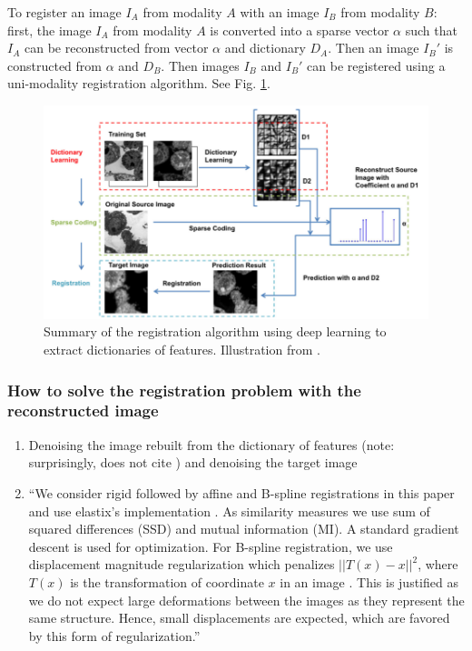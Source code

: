 \documentclass[11pt]{article} %
\begin{document}
To register an image $I_A$ from modality $A$ with an image $I_B$ from modality $B$: first, the image $I_A$ from modality $A$ is converted into a sparse vector $\alpha$ such that $I_A$ can be reconstructed from vector $\alpha$ and dictionary $D_A$. Then an image $I_B'$ is constructed from $\alpha$ and $D_B$. Then images $I_B$ and $I_B'$ can be registered using a uni-modality registration algorithm. See Fig. \ref{fig:dico}.
\begin{figure}[h!]
  \centering
  \includegraphics[width=\linewidth]{dico.png}
  \caption{Summary of the registration algorithm using deep learning to extract dictionaries of features. Illustration from \cite{cao:analogies}.}
  \label{fig:dico}
\end{figure}

\subsubsection{How to solve the registration problem with the reconstructed image}

\begin{enumerate}
  \item Denoising the image rebuilt from the dictionary of features \cite{elad:denoisingdico, li:denoisingdico} (note: surprisingly, \cite{cao:analogies} does not cite \cite{li:denoisingdico}) and denoising the target image
  \item ``We consider rigid followed by affine and B-spline registrations in this paper and use elastix’s implementation \cite{klein:elastix, ibanez:itk}. As similarity measures we use sum of squared differences (SSD) and mutual information
(MI). A standard gradient descent is used for optimization. For B-spline registration, we use displacement
magnitude regularization which penalizes ${||T (x) - x||}^2$,
where $T (x)$ is the transformation of coordinate $x$ in an
image \cite{klein:elastix}. This is justified as we do not
expect large deformations between the images as they
represent the same structure. Hence, small displacements are expected, which are favored by this form of
regularization.'' \cite{cao:analogies}
\end{enumerate}
\end{document}
